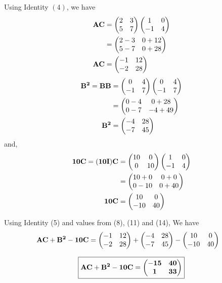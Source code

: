 \documentclass[journal,12pt,twocolumn]{IEEEtran}
\begin{document}
    Using Identity $(4)$, we have
      \begin{align}
      \mathbf{AC}&=
     \begin{pmatrix} 
        2 & 3 \\
        5 & 7
      \end{pmatrix} 
     \begin{pmatrix} 
        1 & 0 \\
        -1 & 4
      \end{pmatrix} \\&=
     \begin{pmatrix} 
        2-3 & 0+12 \\
        5-7 & 0+28
      \end{pmatrix} \\
        \mathbf{AC}&=
       \begin{pmatrix} 
          -1 & 12 \\
          -2 & 28 
        \end{pmatrix} 
      \end{align}
      \begin{align}
      \mathbf{B^2}=\mathbf{BB}
      &=
     \begin{pmatrix} 
        0 & 4 \\
        -1 & 7
      \end{pmatrix} 
     \begin{pmatrix} 
        0 & 4 \\
        -1 & 7
      \end{pmatrix}\\&= 
     \begin{pmatrix} 
        0-4 & 0+28 \\
        0-7 & -4+49
      \end{pmatrix} \\
      \mathbf{B^2}&=
     \begin{pmatrix} 
        -4 & 28 \\
        -7 & 45 
      \end{pmatrix} 
    \end{align}
    and,
      \begin{align}
      \mathbf{10C}=\mathbf{(10I)C} &=
     \begin{pmatrix} 
        10 & 0 \\
        0 & 10
      \end{pmatrix} 
     \begin{pmatrix} 
        1 & 0 \\
        -1 & 4
      \end{pmatrix} 
        \\&=
     \begin{pmatrix} 
        10+0 & 0+0 \\
        0-10 & 0+40
      \end{pmatrix} \\
      \mathbf{10C}&=
     \begin{pmatrix} 
        10 & 0 \\
        -10 & 40
      \end{pmatrix} 
    \end{align}
  
    
    Using Identity (5) and values from (8), (11) and (14), We have
    \begin{align}
      &\mathbf{AC+B^2-10C}= 
     \begin{pmatrix} 
        -1 & 12 \\
        -2 & 28
      \end{pmatrix} 
      +
     \begin{pmatrix} 
        -4 & 28 \\
        -7 & 45
      \end{pmatrix} 
      -
     \begin{pmatrix} 
        10 & 0 \\
        -10 & 40
      \end{pmatrix} 
    \end{align}
    
    \begin{equation}
      \boxed{\mathbf{\mathbf{AC+B^2-10C}} =
       \begin{pmatrix} 
          \mathbf{-15} & \mathbf{40} \\
          \mathbf{1} & \mathbf{33}
        \end{pmatrix} 
        }  
    \end{equation}
\end{document}
